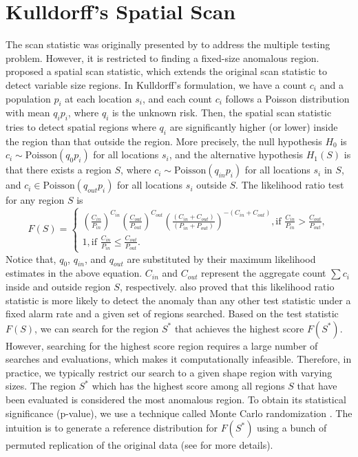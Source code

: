 \documentclass[11pt]{article}
\begin{document}
\section{Kulldorff's Spatial Scan}
The scan statistic was originally presented by \citet{naus1965distribution} to address the multiple testing problem. However, it is restricted to finding a fixed-size anomalous region. \citet{kulldorff1995spatial} proposed a spatial scan statistic, which extends the original scan statistic to detect variable size regions. In Kulldorff's formulation, we have a count $c_i$ and a population $p_i$ at each location $s_i$, and each count $c_i$ follows a Poisson distribution with mean $q_ip_i$, where $q_i$ is the unknown risk. Then, the spatial scan statistic tries to detect spatial regions where $q_i$ are significantly higher (or lower) inside the region than that outside the region. More precisely,  the null hypothesis $H_0$ is $c_i\sim \mbox{Poisson}(q_{0}p_i)$ for all locations $s_i$, and the alternative hypothesis $H_1(S)$ is that there exists a region $S$, where $c_i\sim \mbox{Poisson}(q_{in}p_i)$ for all locations $s_i$ in $S$, and $c_i\in \mbox{Poisson}(q_{out}p_i)$ for all locations $s_i$ outside $S$.  The likelihood ratio test for any region $S$ is 
\begin{equation}
	F(S)=
\begin{cases}
    (\frac{C_{in}}{P_{in}})^{C_{in}}(\frac{C_{out}}{P_{out}})^{C_{out}}(\frac{(C_{in}+C_{out})}{(P_{in}+P_{out})})^{-(C_{in}+C_{out})}, \mbox{if } \frac{C_{in}}{P_{in}}>\frac{C_{out}}{P_{out}}, \\
    1, \mbox{if }\frac{C_{in}}{P_{in}}\leq \frac{C_{out}}{P_{out}}.
\end{cases}
\end{equation}
Notice that, $q_{0}$, $q_{in}$, and $q_{out}$ are substituted by their maximum likelihood estimates in the above equation. $C_{in}$ and $C_{out}$ represent the aggregate count $\sum c_i$ inside and outside region $S$, respectively. \citet{kulldorff1997spatial} also proved that this likelihood ratio statistic is more likely to detect the anomaly than any other test statistic under a fixed alarm rate and a given set of regions searched. Based on the test statistic $F(S)$, we can search for the region $S^*$ that achieves the highest score $F(S^*)$. However, searching for the highest score region requires a large number of searches and evaluations, which makes it computationally infeasible. Therefore, in practice, we typically restrict our search to a given shape region with varying sizes. The region $S^*$ which has the highest score among all regions $S$ that have been evaluated is considered the most anomalous region. To obtain its statistical significance (p-value), we use a technique called Monte Carlo randomization \citep{dwass1957modified}. The intuition is to generate a reference distribution for $F(S^*)$ using a bunch of permuted replication of the original data (see \citet{kulldorff2005space} for more details).
\end{document}
